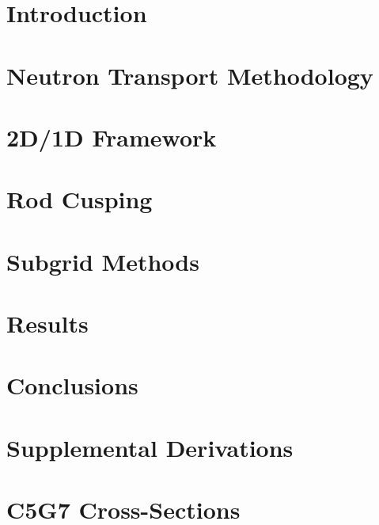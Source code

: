 \documentclass[12pt]{thesis-umich}
\begin{document}

\chapter{Introduction}\label{chap:intro}


\chapter{Neutron Transport Methodology}\label{chap:transport}


\chapter{2D/1D Framework}\label{chap:2d1d}


\chapter{Rod Cusping}\label{chap:cusping}


\chapter{Subgrid Methods}\label{chap:results}


\chapter{Results}\label{chap:proposed}

 
\chapter{Conclusions}\label{chap:concl}


\appendix
\chapter{Supplemental Derivations}\label{app:derivations}


\chapter{C5G7 Cross-Sections}\label{app:c5g7xs}




\end{document}
